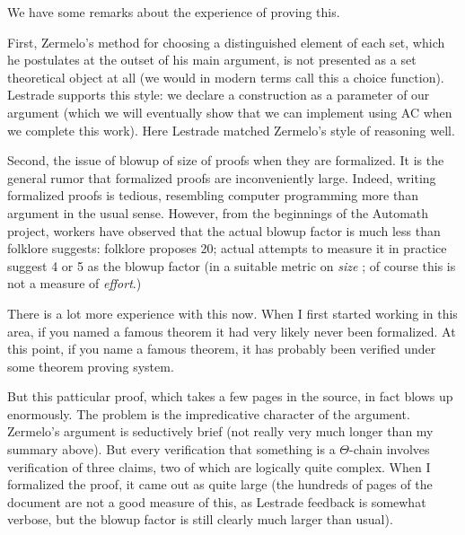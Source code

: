 \documentclass{slides}
\begin{document}
\begin{slide}

We have some remarks about the experience of proving this.

First, Zermelo's method for choosing a distinguished element of each set, which he postulates at the outset of his main argument, is not presented as a set theoretical object at all
(we would in modern terms call this a choice function).  Lestrade supports this style:  we declare a construction as a parameter of our argument (which we will eventually show that
we can implement using AC when we complete this work).  Here Lestrade matched Zermelo's style of reasoning well.

\end{slide}

\begin{slide}

Second, the issue of blowup of size of proofs when they are formalized.  It is the general rumor that formalized proofs are inconveniently large.  Indeed, writing formalized proofs is tedious, resembling computer programming more than argument in the usual sense.  However, from the beginnings of the Automath project, workers have observed that the actual blowup factor is much less than folklore suggests:  folklore proposes 20;  actual attempts to measure it in practice suggest 4 or 5 as the blowup factor (in a suitable metric on {\em size \/};  of course this is not a measure of {\em effort\/}.)

There is a lot more experience with this now.  When I first started working in this area, if you named a famous theorem it had very likely never been formalized.  At this point, if you name a famous theorem, it has probably been verified under some theorem proving system.

\end{slide}

\begin{slide}

But this patticular proof, which takes a few pages in the source, in fact blows up enormously.  The problem is the impredicative character of the argument.  Zermelo's argument is seductively brief (not really very much longer than my summary above).  But every verification that something is a $\Theta$-chain involves verification of three claims, two of which are logically quite complex.  When I formalized the proof, it came out as quite large (the hundreds of pages of the document are not a good measure of this, as Lestrade feedback is somewhat verbose, but the blowup factor is still clearly much larger than usual). 

\end{slide}
\end{document}
